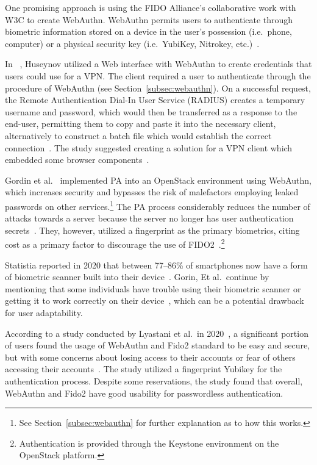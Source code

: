 One promising approach is using the FIDO Alliance's collaborative work with W3C to create WebAuthn.
WebAuthn permits users to authenticate through biometric information
stored on a device in the user's possession (i.e.\ phone, computer) or a
physical security key (i.e.\ YubiKey, Nitrokey, etc.)~\cite{webauthn_level_2}.

In ~\cite{huseynov2022passwordless}, Huseynov utilized a
Web interface with WebAuthn to create credentials that users could use for a VPN\@.
The client required a user to authenticate through the procedure of WebAuthn (see Section~\ref{subsec:webauthn}).
On a successful request, the Remote Authentication Dial-In User Service (RADIUS) creates a temporary username and password, which would then be transferred
as a response to the end-user, permitting them to copy and paste it into the necessary client, alternatively to construct a batch file which would establish the correct connection~\cite{huseynov2022passwordless}.
The study suggested creating a solution for a VPN client which embedded some browser components~\cite{huseynov2022passwordless}.

Gordin et al.~\cite{gordin2021moving} implemented PA into an OpenStack environment using WebAuthn, which increases security and bypasses the risk of malefactors employing leaked passwords on other services.\footnote{
  See Section~\ref{subsec:webauthn} for further explanation as to how this
  works.
}
The PA process considerably reduces the number of attacks towards a server because the server no longer has user authentication secrets~\cite{gordin2021moving}.
They, however, utilized a fingerprint as the primary biometrics, citing cost as a primary factor to discourage the use of FIDO2~\cite{gordin2021moving}.\footnote{
  Authentication is provided through the Keystone environment on the OpenStack platform.
}

Statistia reported in 2020 that between 77--86\% of smartphones now have a form of biometric scanner built into their device~\cite{statista-biometric-transactions}.
Gorin, Et al.\ continue by mentioning that some individuals have trouble
using their biometric scanner or getting it to work correctly on their
device~\cite{gordin2021moving}, which can be a potential drawback for user adaptability.

According to a study conducted by Lyastani et al.\ in 2020~\cite{
  ghrobany2020fido2}, a significant portion of users found the usage of WebAuthn and Fido2 standard to be easy and secure, but with some concerns about losing access to their accounts or fear of others accessing their accounts~\cite{
  ghrobany2020fido2}.
The study utilized a fingerprint Yubikey for the authentication process.
Despite some reservations, the study found that overall, WebAuthn and Fido2
have good usability for passwordless authentication.


